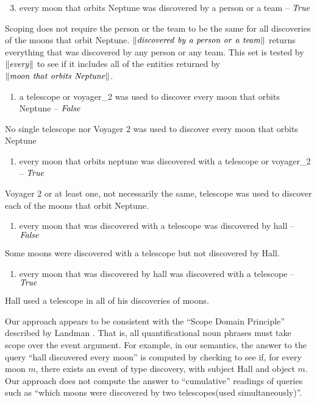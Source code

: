 \documentclass[../main.tex]{subfiles}
\begin{document}
\begin{refsection}
\begin{enumerate}[before=\small, label=\alph*.]
	\setcounter{enumi}{2}
	\item every moon that orbits Neptune was discovered by a person or a team – $\mathit{True}$
\end{enumerate}
\noindent Scoping does not require the person or the team to be the same for all discoveries of the moons that
orbit Neptune. $\meaningof{discovered\ by\ a\ person\ or\ a\ team}$ returns everything that was discovered by any
person or any team. This set is tested by $\lVert \mathit{every} \rVert$ to see if it includes all of the entities returned by
$\meaningof{moon\ that\ orbits\ Neptune}$.
\begin{enumerate}[before=\small, label=\alph*.]
	\setlength\itemsep{0em}
	\setcounter{enumi}{3}
	\item a telescope or voyager\_2 was used to discover every moon that orbits Neptune – $\mathit{False}$
\end{enumerate}
\noindent No single telescope nor Voyager 2 was used to discover every moon that orbits Neptune
\begin{enumerate}[before=\small, label=\alph*.]
	\setlength\itemsep{0em}
	\setcounter{enumi}{4}
	\item every moon that orbits neptune was discovered with a telescope or voyager\_2 – $\mathit{True}$
\end{enumerate}
\noindent Voyager 2 or at least one, not necessarily the same, telescope was used to discover each of the moons
that orbit Neptune.
\begin{enumerate}[before=\small, label=\alph*.]
	\setlength\itemsep{0em}
	\setcounter{enumi}{5}
	\item every moon  that was discovered  with a telescope was discovered by hall – $\mathit{False}$
\end{enumerate}
\noindent  Some moons were discovered with a telescope but not discovered by Hall.
\begin{enumerate}[before=\small, label=\alph*.]
	\setlength\itemsep{0em}
	\setcounter{enumi}{6}
	\item every moon  that was discovered by hall was discovered with a telescope – $\mathit{True}$
\end{enumerate}
\noindent Hall used a telescope in all of his discoveries of moons.

Our approach appears to be consistent with the ``Scope Domain Principle'' described by Landman \cite{landman1996plurality}. That is, all
quantificational noun phrases must take scope over the event argument. For example, in our semantics,
the answer to the query ``hall discovered every moon'' is computed by checking to see if, for every moon
$m$, there exists an event of type discovery, with subject Hall and object $m$. Our approach does not
compute the answer to ``cumulative'' readings of queries such as ``which moons were discovered by two
telescopes(used simultaneously)''.


\end{refsection}
\end{document}
